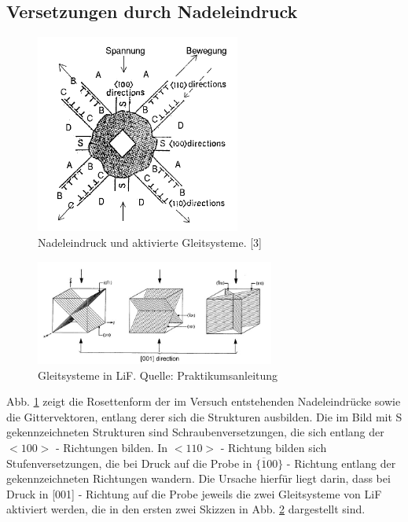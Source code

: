     \subsection{Versetzungen durch Nadeleindruck}
	\begin{figure}[H]
            \centering
            \includegraphics[width=0.6\textwidth]{Images/Question3.PNG}
            \caption{Nadeleindruck und aktivierte Gleitsysteme. [3]}
            \label{FigNadel}
        \end{figure}

	\begin{figure}[H]
            \centering
            \includegraphics[width=0.7\textwidth]{Images/Gleitsysteme.JPG}
            \caption{Gleitsysteme in LiF. Quelle: Praktikumsanleitung}
            \label{FigGleitGel}
        \end{figure}
	
	Abb. \ref{FigNadel} zeigt die Rosettenform der im Versuch entstehenden Nadeleindrücke sowie die Gittervektoren, entlang derer sich die Strukturen ausbilden. 
	Die im Bild mit S gekennzeichneten Strukturen sind Schraubenversetzungen, die sich entlang der $<100>$ - Richtungen bilden. In $<110>$ - Richtung bilden sich
	Stufenversetzungen, die bei Druck auf die Probe in $\{ \overline{1}00\}$ - Richtung entlang der gekennzeichneten Richtungen wandern. Die Ursache hierfür liegt
	darin, dass bei Druck in [001] - Richtung auf die Probe jeweils die zwei Gleitsysteme von LiF aktiviert werden, die in den ersten zwei Skizzen in Abb. 
	\ref{FigGleitGel} dargestellt sind.
	


